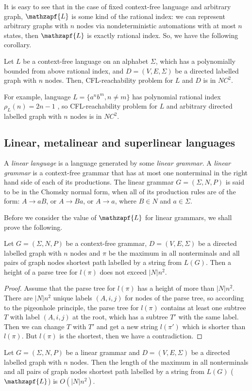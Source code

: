 It is easy to see that in the case of fixed context-free language and arbitrary graph, $\mathzapf{L}$ is some kind of the rational index: we can represent arbitrary graphs with $n$ nodes via nondeterministic automations with at most $n$ states, then $\mathzapf{L}$ is exactly rational index. So, we have the following corollary.
\begin{corollary}
\label{ratdepth}
Let $L$ be a context-free language on an alphabet $\Sigma$, which has a polynomially bounded from above rational index, and $D=(V, E, \Sigma)$ be a directed labelled graph with $n$ nodes. Then, CFL-reachability problem for $L$ and $D$ is in $NC^2$.
\end{corollary}


For example, language $L = \{a^nb^m, n \neq m\}$ has polynomial rational index $\rho_L(n) = 2n -1$ \cite{GreibRat}, so CFL-reachability problem for $L$ and arbitrary directed labelled graph with $n$ nodes is in $NC^2$.
\subsection{Linear, metalinear and superlinear languages}
A \textit{linear language} is a language generated by some \textit{linear grammar}. A \textit{linear grammar} is a context-free grammar that has at most one nonterminal in the right hand side of each of its productions. The linear grammar  $G = (\Sigma, N, P)$ is said to be in the Chomsky normal form, when all of its production rules are of the form: $A \rightarrow aB$, or $A \rightarrow Ba$, or $A \rightarrow a$, where $B \in N$ and $a \in \Sigma$.


Before we consider the value of $\mathzapf{L}$ for linear grammars, we shall prove the following.
\begin{lemma}
\label{lem:treeheight}
Let  $G = (\Sigma, N, P)$ be a context-free grammar,  $D=(V, E, \Sigma)$ be a directed labelled graph with $n$ nodes and $\pi$ be the maximum in all nonterminals and all pairs of graph nodes shortest path labelled by a string from $L(G)$. Then a height of a parse tree for $l(\pi)$ does not exceed $|N|n^2$.
\end{lemma}

\begin{proof}
 Assume that the parse tree for $l(\pi)$ has a height of more than $|N|n^2$. There are $|N|n^2$ unique labels $(A, i, j)$ for nodes of the parse tree, so according to the pigeonhole principle, the parse tree for $l(\pi)$ contains at least one subtree $T$ with label $(A, i, j)$ at the root, which has a subtree $T'$ with the same label. Then we can change $T$ with $T'$ and get a new string $l(\pi')$ which is shorter than $l(\pi)$. But $l(\pi)$ is the shortest, then we have a contradiction.

\end{proof}
\begin{theorem}
\label{thlin}
Let  $G = (\Sigma, N, P)$ be a linear grammar and $D=(V, E, \Sigma)$ be a directed labelled graph with $n$ nodes. Then the length of the maximum in all nonterminals and all pairs of graph nodes shortest path labelled by a string from $L(G)$ ($\mathzapf{L}$) is $O(|N|n^2)$.
\end{theorem}

